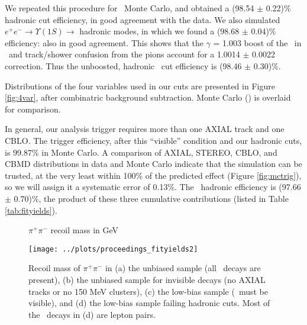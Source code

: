 \documentclass[aps,prd,preprint,superscriptaddress,tightenlines,nofootinbib,floatfix]{revtex4}
\begin{document}
We repeated this procedure for \twotoone\ Monte Carlo, and obtained a
(98.54 $\pm$ 0.22)\% hadronic cut efficiency, in good agreement with
the data.  We also simulated $e^+e^- \to \Upsilon(1S) \to$ hadronic
modes, in which we found a (98.68 $\pm$ 0.04)\% efficiency: also in
good agreement.  This shows that the $\gamma$ = 1.003 boost of the
\uone\ in \twotoone\ and track/shower confusion from the pions account
for a 1.0014 $\pm$ 0.0022 correction.  Thus the unboosted, hadronic
\uone\ cut efficiency is (98.46 $\pm$ 0.30)\%.

Distributions of the four variables used in our cuts are presented in
Figure \ref{fig:4var}, after combinatric background subtraction.
Monte Carlo (\twotoone) is overlaid for comparison.

In general, our analysis trigger requires more than one AXIAL track
and one CBLO.  The trigger efficiency, after this ``visible''
condition and our hadronic cuts, is 99.87\% in Monte Carlo.  A
comparison of AXIAL, STEREO, CBLO, and CBMD distributions in data and
Monte Carlo indicate that the simulation can be trusted, at the very
least within 100\% of the predicted effect (Figure \ref{fig:mctrig}),
so we will assign it a systematic error of 0.13\%.  The \uone\
hadronic efficiency is (97.66 $\pm$ 0.70)\%, the product of these
three cumulative contributions (listed in Table \ref{tab:fityields}).

\begin{figure}[t]
  \begin{center}
    \Large $\pi^+\pi^-$ recoil mass in GeV
  \end{center}

  \vspace{-1.8 cm}
  \begin{center}
    \texttt{[image: ../plots/proceedings\_fityields2]}
  \end{center}
  \caption{\label{fig:recoil} Recoil mass of $\pi^+\pi^-$ in (a) the
    unbiased sample (all \ups\ decays are present), (b) the unbiased
    sample for invisible decays (no AXIAL tracks or no 150 MeV
    clusters), (c) the low-bias sample (\ups\ must be visible), and
    (d) the low-bias sample failing hadronic cuts.  Most of the \uone\
    decays in (d) are lepton pairs.}
\end{figure}
\end{document}
